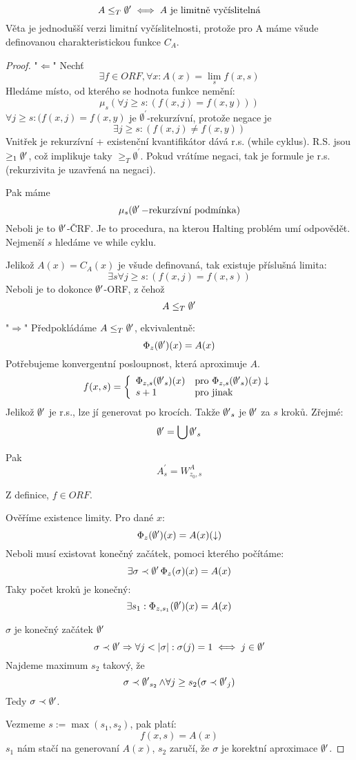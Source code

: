\begin{theorem}\label{lim_comp}
	\[ A \leq_T \operatorname{\emptyset^{\prime}} \iff A\ \text{je limitně vyčíslitelná} \]
	Věta je jednodušší verzi limitní vyčíslitelnosti, protože pro A máme všude definovanou charakteristickou funkce $C_A$.
\end{theorem}
\begin{proof}
	"$\Leftarrow$" Nechť
	\[ \exists f \in ORF, \forall x: A(x) = \lim_s f(x, s) \]
	Hledáme místo, od kterého se hodnota funkce nemění:
	\[ \mu_s(\forall j \geq s:(f(x, j) = f(x, y))) \]
	$\forall j \geq s:(f(x, j) = f(x, y)$ je $\emptyset^{\prime}$-rekurzívní, protože negace je
	\[ \exists j \geq s:(f(x, j) \neq f(x, y)) \]
	Vnitřek je rekurzívní + existenční kvantifikátor dává r.s. (while cyklus).
	R.S. jsou $\geq_1 \operatorname{\emptyset^{\prime}}$, což implikuje taky $\geq_T \emptyset^{\prime}$.
	Pokud vrátíme negaci, tak je formule je r.s. (rekurzivita je uzavřená na negaci).

	Pak máme
	\[ \mu_s(\operatorname{\emptyset^{\prime}}-\text{rekurzívní podmínka}) \]
	Neboli je to $\operatorname{\emptyset^{\prime}}$-ČRF.
	Je to procedura, na kterou Halting problém umí odpovědět.
	Nejmenší $s$ hledáme ve while cyklu.

	Jelikož $A(x) = C_A(x)$ je všude definovaná, tak existuje příslušná limita:
	\[ \exists s \forall j \geq s:(f(x, j) = f(x, s)) \]
	Neboli je to dokonce $\operatorname{\emptyset^{\prime}}$-ORF, z čehož
	\[ A \leq_T \operatorname{\emptyset^{\prime}} \]

	"$\Rightarrow$" Předpokládáme $A \leq_T \operatorname{\emptyset^{\prime}}$, ekvivalentně:
	\[ \Phi_z(\operatorname{\emptyset^{\prime}})(x) = A(x) \]
	Potřebujeme konvergentní posloupnost, která aproximuje $A$.
	\[ f(x, s) = \left\{ \begin{array}{ll} \Phi_{z, s}(\operatorname{\emptyset^{\prime}}_s)(x) & \mbox{pro } \Phi_{z, s}(\operatorname{\emptyset^{\prime}}_s)(x) \downarrow \\ s + 1 & \mbox{pro } \text{jinak} \end{array} \right. \]
	Jelikož $\operatorname{\emptyset^{\prime}}$ je r.s., lze jí generovat po krocích.
	Takže $\operatorname{\emptyset^{\prime}}_s$ je $\operatorname{\emptyset^{\prime}}$ za $s$ kroků.
	Zřejmé:
	\[ \operatorname{\emptyset^{\prime}} = \bigcup \operatorname{\emptyset^{\prime}}_s \]

	Pak
	\[ A_s^{\prime} = W_{z_0, s}^A \]

	Z definice, $f \in ORF$.

	Ověříme existence limity.
	Pro dané $x$:
	\[ \Phi_{z}(\operatorname{\emptyset^{\prime}})(x) = A(x) (\downarrow) \]
	Neboli musí existovat konečný začátek, pomoci kterého počítáme:
	\[ \exists \sigma \prec \operatorname{\emptyset^{\prime}} \Phi_{z}(\sigma)(x) = A(x)\]
	Taky počet kroků je konečný:
	\[ \exists s_1: \Phi_{z, s_1}(\operatorname{\emptyset^{\prime}})(x) = A(x) \]

	$\sigma$ je konečný začátek $\operatorname{\emptyset^{\prime}}$
	\[ \sigma \prec \operatorname{\emptyset^{\prime}} \Rightarrow \forall j < |\sigma|: \sigma(j) = 1 \iff j \in \operatorname{\emptyset^{\prime}} \]
	Najdeme maximum $s_2$ takový, že
	\[ \sigma \prec \operatorname{\emptyset^{\prime}}_{s_2} \land \forall j \geq s_2 (\sigma \prec \operatorname{\emptyset^{\prime}}_j) \]
	Tedy $\sigma \prec \operatorname{\emptyset^{\prime}}$.

	Vezmeme $s:= \max(s_1, s_2)$, pak platí:
	\[ f(x, s) = A(x) \]
	$s_1$ nám stačí na generovaní $A(x)$, $s_2$ zaručí, že $\sigma$ je korektní aproximace $\operatorname{\emptyset^{\prime}}$.
\end{proof}

